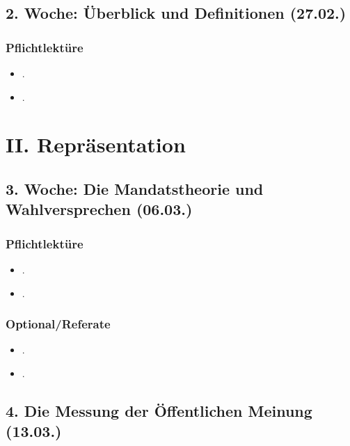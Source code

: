 \documentclass[abstract=on,parskip=full,headings=standardclasses,fontsize=11pt,paper=a4]{scrartcl}
\begin{document}
\subsection{2. Woche: Überblick  und Definitionen (27.02.)}



\subsubsection*{Pflichtlektüre}
\begin{itemize}
\item {}.
\item {}.
\end{itemize}


\section{II. Repräsentation}

\subsection{3. Woche: Die Mandatstheorie und Wahlversprechen (06.03.)}

\subsubsection*{Pflichtlektüre}
\begin{itemize}
\item {}.
\item {}.
\end{itemize}

\subsubsection*{Optional/Referate}
\begin{itemize}
\item {}.
\item {}.
\end{itemize}


\subsection{4. Die Messung der Öffentlichen Meinung (13.03.)}
\end{document}
